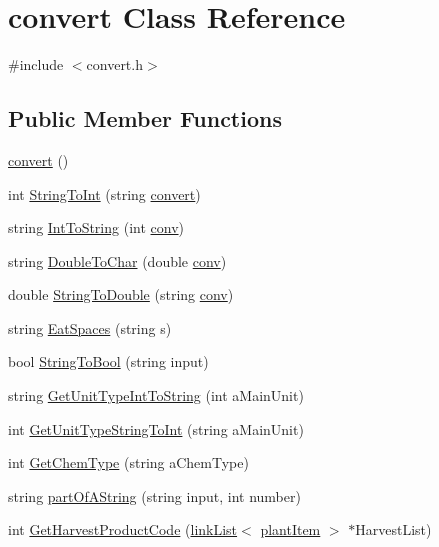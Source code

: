 \hypertarget{classconvert}{
\section{convert Class Reference}
\label{classconvert}
}


{\ttfamily \#include $<$convert.h$>$}\subsection*{Public Member Functions}
\begin{DoxyCompactItemize}
\item 
\hyperlink{classconvert_a20aaf90e85ae0b32c0f8022d90d797eb}{convert} ()
\item 
int \hyperlink{classconvert_abeb1bd944022811cd077260e7ea36b7a}{StringToInt} (string \hyperlink{classconvert}{convert})
\item 
string \hyperlink{classconvert_a15b1798af013fa0fe978f3253e0c12e4}{IntToString} (int \hyperlink{common_data_8cpp_aa90e9720f0d32576cbd955d2eafc649b}{conv})
\item 
string \hyperlink{classconvert_aacc8f3cb1e7a2a82a125f819968cad40}{DoubleToChar} (double \hyperlink{common_data_8cpp_aa90e9720f0d32576cbd955d2eafc649b}{conv})
\item 
double \hyperlink{classconvert_a05cb54cb7b93d0d1cc3f4102d7a61cd6}{StringToDouble} (string \hyperlink{common_data_8cpp_aa90e9720f0d32576cbd955d2eafc649b}{conv})
\item 
string \hyperlink{classconvert_aa6f91ed1b82ad81d914117320c9d5428}{EatSpaces} (string s)
\item 
bool \hyperlink{classconvert_a06228e8cf1a860110b210a46f9ce1eaa}{StringToBool} (string input)
\item 
string \hyperlink{classconvert_ab5846cd273928b43424ee716b6a302d8}{GetUnitTypeIntToString} (int aMainUnit)
\item 
int \hyperlink{classconvert_a9dd6fb1311ba8af2a6d33f1b370b4cbc}{GetUnitTypeStringToInt} (string aMainUnit)
\item 
int \hyperlink{classconvert_a66b4128c2191873240954813691f8406}{GetChemType} (string aChemType)
\item 
string \hyperlink{classconvert_a769ad855968f46036c456171a28c4a50}{partOfAString} (string input, int number)
\item 
int \hyperlink{classconvert_a6acbe29be64d48889f62d442e2aa62f2}{GetHarvestProductCode} (\hyperlink{classlink_list}{linkList}$<$ \hyperlink{classplant_item}{plantItem} $>$ $\ast$HarvestList)
\end{DoxyCompactItemize}



